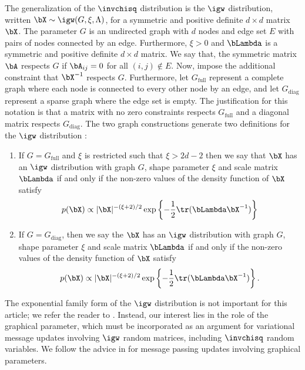 \documentclass[12pt]{article}
\theoremstyle{plain}
\theoremstyle{definition}
\theoremstyle{remark}
\begin{document}
The generalization of the $\invchisq$ distribution is the $\igw$ distribution, written $\bX \sim \igw (G, \xi, \Lambda)$,
for a symmetric and positive definite $d \times d$ matrix $\bX$.
The parameter $G$ is an undirected graph with $d$ nodes and edge
set $E$ with pairs of nodes connected by an edge. Furthermore, $\xi > 0$ and
$\bLambda$ is a symmetric and positive definite $d \times d$ matrix.
We say that, the symmetric matrix $\bA$ respects $G$ if $\bA_{ij} = 0$
for all $( i, j ) \notin E$. Now, impose the additional constraint that  $\bX^{-1}$ respects $G$. Furthermore, let $G_{\text{full}}$ represent a
complete graph where each node is connected
to every other node by an edge, and let $G_{\text{diag}}$ represent a sparse graph where the edge set is empty.
The justification for this notation is that a matrix with no zero constraints respects $G_{\text{full}}$ and a diagonal
matrix respects $G_{\text{diag}}$.
The two graph constructions generate two definitions for the $\igw$ distribution \cite[Definition~3]{maestrini20}:

\begin{enumerate}[label={(\alph*)}]
	\item If $G = G_{\text{full}}$ and $\xi$ is restricted such that $\xi > 2d - 2$ then we say that $\bX$ has an $\igw$
	distribution with graph $G$, shape parameter $\xi$ and scale matrix $\bLambda$ if and only if the non-zero
	values of the density function of $\bX$ satisfy
		\[
			p (\bX) \propto |\bX|^{-(\xi + 2)/2} \exp \left\{ -\frac12 \tr (\bLambda \bX^{-1}) \right\}
		\]
	\item If $G = G_{\text{diag}}$, then we say the $\bX$ has an $\igw$
	distribution with graph $G$, shape parameter $\xi$ and scale matrix $\bLambda$ if and only if the non-zero
	values of the density function of $\bX$ satisfy
		\[
			p (\bX) \propto |\bX|^{-(\xi + 2)/2} \exp \left\{ -\frac12 \tr (\bLambda \bX^{-1}) \right\}.
		\]
\end{enumerate}

The exponential family form of the $\igw$ distribution is not important for this article; we refer the reader to
. Instead, our interest lies in the role of the graphical parameter, which must be
incorporated as an argument for variational message updates involving $\igw$ random matrices, including
$\invchisq$ random variables. We follow the advice in  for message passing
updates involving graphical parameters.

\end{document}
